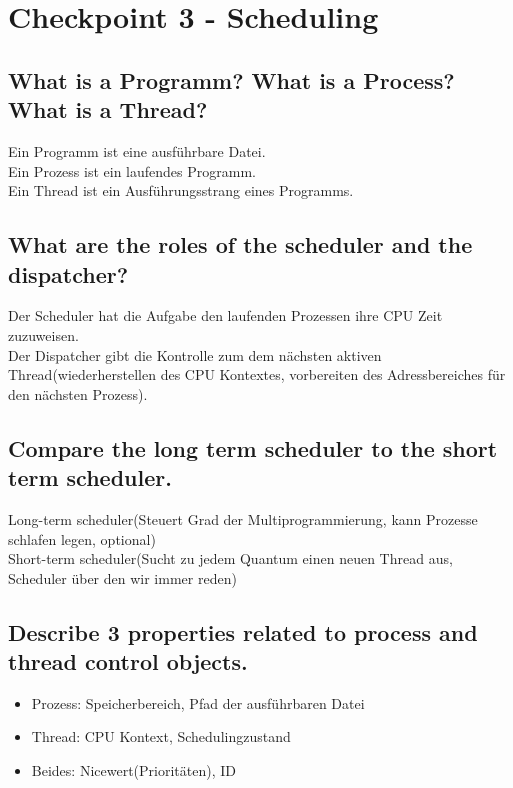 \section{Checkpoint 3 - Scheduling}

\addtocounter{subsection}{1}

\subsection{What is a Programm? What is a Process? What is a Thread?}
Ein Programm ist eine ausf\"uhrbare Datei.\\
Ein Prozess ist ein laufendes Programm.\\
Ein Thread ist ein Ausf\"uhrungsstrang eines Programms.

\subsection{\important What are the roles of the scheduler and the dispatcher?}
Der Scheduler hat die Aufgabe den laufenden Prozessen ihre CPU Zeit zuzuweisen.\\
Der Dispatcher gibt die Kontrolle zum dem n\"achsten aktiven Thread(wiederherstellen des CPU Kontextes, vorbereiten des Adressbereiches f\"ur den n\"achsten Prozess).

\subsection{Compare the long term scheduler to the short term scheduler.}
Long-term scheduler(Steuert Grad der Multiprogrammierung, kann Prozesse schlafen legen, optional)\\
Short-term scheduler(Sucht zu jedem Quantum einen neuen Thread aus, Scheduler \"uber den wir immer reden)

\subsection{Describe 3 properties related to process and thread control objects.}
\begin{itemize}
	\setlength\itemsep{-0.5em}
	\item Prozess: Speicherbereich, Pfad der ausf\"uhrbaren Datei
	\item Thread: CPU Kontext, Schedulingzustand
	\item Beides: Nicewert(Priorit\"aten), ID
\end{itemize}

